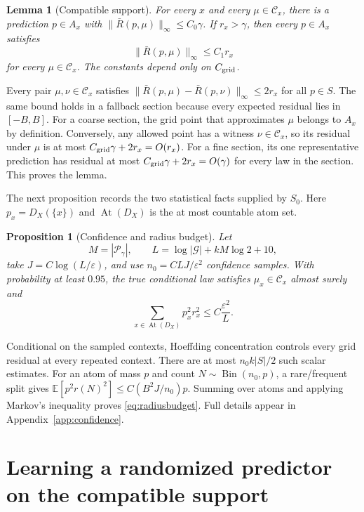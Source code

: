 \documentclass{article}
\newtheorem{lemma}[theorem]{Lemma}
\newtheorem{proposition}[theorem]{Proposition}
\theoremstyle{definition}
\theoremstyle{remark}
\newcommand{\E}{\mathbb E}
\newcommand{\1}{\mathbf 1}
\newcommand{\cG}{\mathcal G}
\newcommand{\cP}{\mathcal P}
\newcommand{\cC}{\mathcal C}
\newcommand{\At}{\operatorname{At}}
\begin{document}
\begin{lemma}[Compatible support]\label{lem:support}
For every $x$ and every $\mu\in\cC_x$, there is a prediction $p\in A_x$ with $\|\bar R(p,\mu)\|_\infty\le C_0\gamma$. If $r_x>\gamma$, then every $p\in A_x$ satisfies
\[
\|\bar R(p,\mu)\|_\infty\le C_1r_x
\]
for every $\mu\in\cC_x$. The constants depend only on $C_{\rm grid}$.
\end{lemma}

Every pair $\mu,\nu\in\cC_x$ satisfies $\|\bar R(p,\mu)-\bar R(p,\nu)\|_\infty\le2r_x$ for all $p\in S$. The same bound holds in a fallback section because every expected residual lies in $[-B,B]$. For a coarse section, the grid point that approximates $\mu$ belongs to $A_x$ by definition. Conversely, any allowed point has a witness $\nu\in\cC_x$, so its residual under $\mu$ is at most $C_{\rm grid}\gamma+2r_x=O(r_x)$. For a fine section, its one representative prediction has residual at most $C_{\rm grid}\gamma+2r_x=O(\gamma)$ for every law in the section. This proves the lemma.

The next proposition records the two statistical facts supplied by $S_0$. Here $p_x=D_X(\{x\})$ and $\At(D_X)$ is the at most countable atom set.

\begin{proposition}[Confidence and radius budget]\label{prop:confidence}
Let
\[
M=|\cP_\gamma|,\qquad L=\log|\cG|+kM\log2+10,
\]
take $J=C\log(L/\varepsilon)$, and use $n_0=CLJ/\varepsilon^2$ confidence samples. With probability at least $0.95$, the true conditional law satisfies $\mu_x\in\cC_x$ almost surely and
\begin{equation}
\sum_{x\in\At(D_X)}p_x^2r_x^2\le C\frac{\varepsilon^2}{L}.
\label{eq:radiusbudget}
\end{equation}
\end{proposition}

Conditional on the sampled contexts, Hoeffding concentration controls every grid residual at every repeated context. There are at most $n_0k|S|/2$ such scalar estimates. For an atom of mass $p$ and count $N\sim\operatorname{Bin}(n_0,p)$, a rare/frequent split gives $\E[p^2r(N)^2]\le C(B^2J/n_0)p$. Summing over atoms and applying Markov's inequality proves \eqref{eq:radiusbudget}. Full details appear in Appendix~\ref{app:confidence}.

\section{Learning a randomized predictor on the compatible support}
\end{document}
